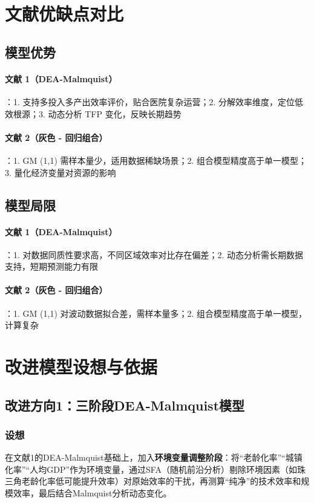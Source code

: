 \documentclass{MathNoteCN}
\begin{document}
\section{文献优缺点对比}
\subsection{模型优势}
\paragraph{文献 1（DEA-Malmquist）}：1. 支持多投入多产出效率评价，贴合医院复杂运营；2. 分解效率维度，定位低效根源；3. 动态分析 TFP 变化，反映长期趋势
\paragraph{文献 2（灰色 - 回归组合）}：1. GM (1,1) 需样本量少，适用数据稀缺场景；2. 组合模型精度高于单一模型；3. 量化经济变量对资源的影响
\subsection{模型局限}
\paragraph{文献 1（DEA-Malmquist）}：1. 对数据同质性要求高，不同区域效率对比存在偏差；2. 动态分析需长期数据支持，短期预测能力有限
\paragraph{文献 2（灰色 - 回归组合）}：1. GM (1,1) 对波动数据拟合差，需样本量多；2. 组合模型精度高于单一模型，计算复杂

\section{改进模型设想与依据}
\subsection{改进方向1：三阶段DEA-Malmquist模型}
\subsubsection{设想}
在文献1的DEA-Malmquist基础上，加入\textbf{环境变量调整阶段}：将“老龄化率”“城镇化率”“人均GDP”作为环境变量，通过SFA（随机前沿分析）剔除环境因素（如珠三角老龄化率低可能提升效率）对原始效率的干扰，再测算“纯净”的技术效率和规模效率，最后结合Malmquist分析动态变化。
\end{document}
